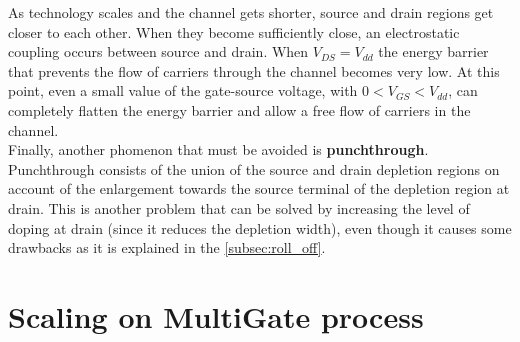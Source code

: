 \documentclass[a4paper, 12pt, twoside, openright]{report}
\begin{document}
As technology scales and the channel gets shorter, source and drain regions get closer to each other. When they become sufficiently close, an electrostatic coupling occurs between source and drain. When $V_{DS}=V_{dd}$ the energy barrier that prevents the flow of carriers through the channel becomes very low. At this point, even a small value of the gate-source voltage, with $0 < V_{GS} < V_{dd}$, can completely flatten the energy barrier and allow a free flow of carriers in the channel. \\
Finally, another phomenon that must be avoided is \textbf{punchthrough}. Punchthrough consists of the union of the source and drain depletion regions on account of the enlargement towards the source terminal of the depletion region at drain. This is another problem that can be solved by increasing the level of doping at drain (since it reduces the depletion width), even though it causes some drawbacks as it is explained in the \ref{subsec:roll_off}.\\
 






\chapter{Scaling on MultiGate process} \label{multigate}
\end{document}
